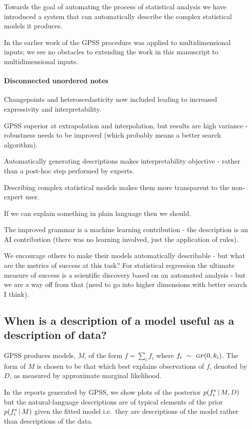 \documentclass{article}
\def\ie{i.e.\ }
\begin{document}
Towards the goal of automating the process of statistical analysis we have introduced a system that can automatically describe the complex statistical models it produces.

In the earlier work of \cite{DuvLloGroetal13} the GPSS procedure was applied to multidimensional inputs; we see no obstacles to extending the work in this manuscript to multidimensional inputs.

\paragraph{Disconnected unordered notes}

Changepoints and heteroscedasticity now included leading to increased expressivity and interpretability.

GPSS superior at extrapolation and interpolation, but results are high variance - robustness needs to be improved (which probably means a better search algorithm).

Automatically generating descriptions makes interpretability objective - rather than a post-hoc step performed by experts.

Describing complex statistical models makes them more transparent to the non-expert user.

If we can explain something in plain language then we should.

The improved grammar is a machine learning contribution - the description is an AI contribution (there was no learning involved, just the application of rules).

We encourage others to make their models automatically describable - but what are the metrics of success at this task?
For statistical regression the ultimate measure of success is a scientific discovery based on an automated analysis - but we are a way off from that (need to go into higher dimensions with better search I think).

\subsection{When is a description of a model useful as a description of data?}

GPSS produces models, $M$, of the form $f = \sum_i f_i$ where $f_i \ \sim\  {\textsc{gp}}{}(0, k_i)$.
The form of $M$ is chosen to be that which best explains observations of $f$, denoted by $D$, as measured by approximate marginal likelihood.

In the reports generated by GPSS, we show plots of the posterior $p(f_i^*\,|\, M,D)$ but the natural-language descriptions are of typical elements of the prior $p(f_i^*\,|\, M)$ given the fitted model \ie they are descriptions of the model rather than descriptions of the data.
\end{document}
